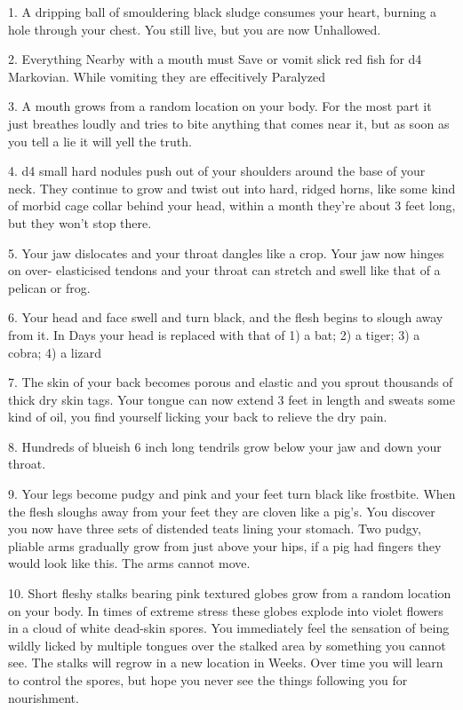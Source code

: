1. A dripping ball of smouldering black sludge consumes your heart, burning a hole through your chest. You still live, but you are now Unhallowed.



2. Everything Nearby with a mouth must Save or vomit slick red fish for d4 Markovian.  While vomiting they are effecitively Paralyzed



3. A mouth grows from a random location on your body. For the most part it just breathes loudly and tries to bite anything that comes near it, but as soon as you tell a lie it will yell the truth.



4. d4 small hard nodules push out of your shoulders around the base of your neck. They continue to grow and twist out into hard, ridged horns, like some kind of morbid cage collar behind your head, within a month they're about 3 feet long, but they won't stop there. 


5. Your jaw dislocates and your throat dangles like a crop. Your jaw now hinges on over- elasticised tendons and your throat can stretch and swell like that of a pelican or frog.



6. Your head and face swell and turn black, and the flesh begins to slough away from it.  In Days your head is replaced with that of 1) a bat; 2) a tiger; 3) a cobra; 4) a lizard



7. The skin of your back becomes porous and elastic and you sprout thousands of thick dry skin tags. Your tongue can now extend 3 feet in length and sweats some kind of oil, you find yourself licking your back to relieve the dry pain.



8. Hundreds of blueish 6 inch long tendrils grow below your jaw and down your throat. 



9. Your legs become pudgy and pink and your feet turn black like frostbite. When the flesh sloughs away from your feet they are cloven like a pig's. You discover you now have three sets of distended teats lining your stomach. Two pudgy, pliable arms gradually grow from just above your hips, if a pig had fingers they would look like this.  The arms cannot move.



10. Short fleshy stalks bearing pink textured globes grow from a random location on your body. In times of extreme stress these globes explode into violet flowers in a cloud of white dead-skin spores. You immediately feel the sensation of being wildly licked by multiple tongues over the stalked area by something you cannot see. The stalks will regrow in a new location in Weeks. Over time you will learn to control the spores, but hope you never see the things following you for nourishment.



